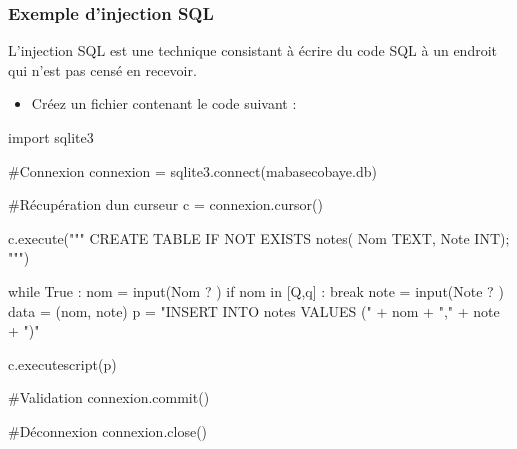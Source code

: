 \documentclass[
  letterpaper,
  DIV=11,
  numbers=noendperiod]{scrartcl}
\newenvironment{Shaded}{\begin{snugshade}}{\end{snugshade}}
\newcommand{\BuiltInTok}[1]{\textcolor[rgb]{0.00,0.23,0.31}{#1}}
\newcommand{\CommentTok}[1]{\textcolor[rgb]{0.37,0.37,0.37}{#1}}
\newcommand{\ControlFlowTok}[1]{\textcolor[rgb]{0.00,0.23,0.31}{#1}}
\newcommand{\ExtensionTok}[1]{\textcolor[rgb]{0.00,0.23,0.31}{#1}}
\newcommand{\ImportTok}[1]{\textcolor[rgb]{0.00,0.46,0.62}{#1}}
\newcommand{\KeywordTok}[1]{\textcolor[rgb]{0.00,0.23,0.31}{#1}}
\newcommand{\NormalTok}[1]{\textcolor[rgb]{0.00,0.23,0.31}{#1}}
\newcommand{\OperatorTok}[1]{\textcolor[rgb]{0.37,0.37,0.37}{#1}}
\newcommand{\StringTok}[1]{\textcolor[rgb]{0.13,0.47,0.30}{#1}}
\newcommand{\VariableTok}[1]{\textcolor[rgb]{0.07,0.07,0.07}{#1}}
\providecommand{\tightlist}{%
  \setlength{\itemsep}{0pt}\setlength{\parskip}{0pt}}\usepackage{longtable,booktabs,array}
\begin{document}
\hypertarget{exemple-dinjection-sql}{%
\subsubsection{Exemple d'injection SQL}\label{exemple-dinjection-sql}}

L'injection SQL est une technique consistant à écrire du code SQL à un
endroit qui n'est pas censé en recevoir.

\begin{itemize}
\tightlist
\item
  Créez un fichier contenant le code suivant :
\end{itemize}

\begin{Shaded}
\begin{Highlighting}[]
\ImportTok{import}\NormalTok{ sqlite3}

\CommentTok{\#Connexion}
\NormalTok{connexion }\OperatorTok{=}\NormalTok{ sqlite3.}\ExtensionTok{connect}\NormalTok{(}\StringTok{\textquotesingle{}mabasecobaye.db\textquotesingle{}}\NormalTok{)}

\CommentTok{\#Récupération d\textquotesingle{}un curseur}
\NormalTok{c }\OperatorTok{=}\NormalTok{ connexion.cursor()}

\NormalTok{c.execute(}\StringTok{"""}
\StringTok{    CREATE TABLE IF NOT EXISTS notes(}
\StringTok{    Nom TEXT,}
\StringTok{    Note INT);}
\StringTok{    """}\NormalTok{)}

\ControlFlowTok{while} \VariableTok{True}\NormalTok{ :}
\NormalTok{    nom }\OperatorTok{=} \BuiltInTok{input}\NormalTok{(}\StringTok{\textquotesingle{}Nom ? \textquotesingle{}}\NormalTok{)}
    \ControlFlowTok{if}\NormalTok{ nom }\KeywordTok{in}\NormalTok{ [}\StringTok{\textquotesingle{}Q\textquotesingle{}}\NormalTok{,}\StringTok{\textquotesingle{}q\textquotesingle{}}\NormalTok{] :}
        \ControlFlowTok{break}
\NormalTok{    note }\OperatorTok{=} \BuiltInTok{input}\NormalTok{(}\StringTok{\textquotesingle{}Note ? \textquotesingle{}}\NormalTok{)}
\NormalTok{    data }\OperatorTok{=}\NormalTok{ (nom, note)}
\NormalTok{    p }\OperatorTok{=} \StringTok{"INSERT INTO notes VALUES (\textquotesingle{}"} \OperatorTok{+}\NormalTok{ nom }\OperatorTok{+} \StringTok{"\textquotesingle{},\textquotesingle{}"} \OperatorTok{+}\NormalTok{ note }\OperatorTok{+} \StringTok{"\textquotesingle{})"}

\NormalTok{    c.executescript(p)}

\CommentTok{\#Validation}
\NormalTok{connexion.commit()}

\CommentTok{\#Déconnexion}
\NormalTok{connexion.close()}
\end{Highlighting}
\end{Shaded}
\end{document}
